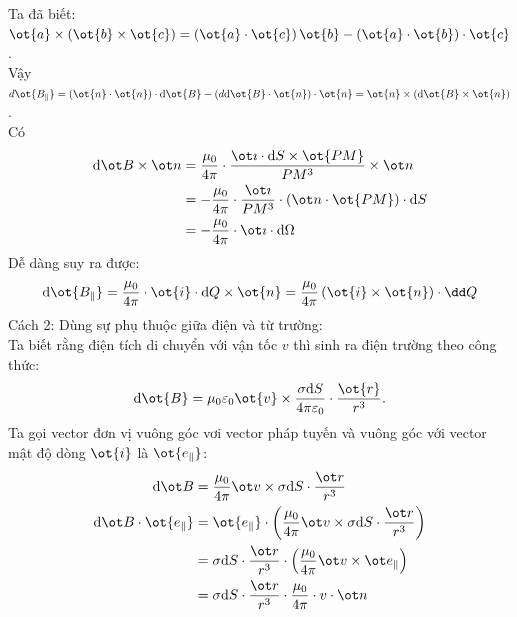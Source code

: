 \begin{loigiai}
\begin{enumerate}[1)]
Ta đã biết: $\ot{a}\times\left(\ot{b}\times\ot{c}\right)=\left(\ot{a}\cdot\ot{c}\right)\ot{b}-\left(\ot{a}\cdot\ot{b}\right)\cdot\ot{c}$.\\
Vậy $d\ot{B_\parallel}=\left(\ot{n}\cdot\ot{n}\right)\cdot \mathrm{d}\ot{B}-\left(d\mathrm{d}\ot{B}\cdot\ot{n}\right)\cdot\ot{n}=\ot{n}\times\left(\mathrm{d}\ot{B}\times\ot{n}\right)$.\\
Có
\begin{align*}
    \mathrm{d}\ot B \times \ot n &= \dfrac{{{\mu _0}}}{{4\pi }} \cdot \dfrac{{\ot \imath  \cdot \mathrm{d}S \times \ot {PM} }}{{P{M^3}}} \times \ot n \\&=  - \dfrac{{{\mu _0}}}{{4\pi }} \cdot \dfrac{{\ot \imath }}{{P{M^3}}} \cdot (\ot n \cdot \ot {PM} ) \cdot \mathrm{d}S \\&=  - \dfrac{{{\mu _0}}}{{4\pi }} \cdot \ot \imath  \cdot \mathrm{d}\Omega
\end{align*}
Dễ dàng suy ra được:
$$\mathrm{d}\ot{B_\parallel}=\dfrac{\mu_0}{4\pi}\cdot \ot{i}\cdot \mathrm{d}Q\times\ot{n}=\dfrac{\mu_0}{4\pi}\left(\ot{i}\times\ot{n}\right)\cdot \dd Q$$
Cách 2: Dùng sự phụ thuộc giữa điện và từ trường:\\
Ta biết rằng điện tích di chuyển với vận tốc $v$ thì sinh ra điện trường theo công thức:
$$\mathrm{d}\ot{B}=\mu_0\varepsilon_0\ot{v}\times\dfrac{\sigma \mathrm{d}S}{4\pi\varepsilon_0}\cdot\dfrac{\ot{r}}{r^3}.$$
Ta gọi vector đơn vị vuông góc vơi vector pháp tuyến và vuông góc với vector mật độ dòng $\ot{i}$ là $\ot{e_\parallel}$:
\begin{align*}
    \mathrm{d}\ot B &= \dfrac{{{\mu_0}}}{{4\pi }}\ot v \times \sigma \mathrm{d}S \cdot \dfrac{{\ot r}}{{{r^3}}}\\
\mathrm{d}\ot B \cdot \ot {{e_\parallel}}  &= \ot {{e_\parallel}}  \cdot \left( {\dfrac{{{\mu_0}}}{{4\pi }}\ot v \times \sigma \mathrm{d}S \cdot \dfrac{{\ot r}}{{{r^3}}}} \right)
\\&= \sigma \mathrm{d}S \cdot \dfrac{{\ot r}}{{{r^3}}} \cdot \left( {\dfrac{\mu_0}{4\pi }\ot v \times {{\ot e_\parallel}}} \right) \\&= \sigma \mathrm{d}S \cdot \dfrac{{\ot r}}{{{r^3}}} \cdot \dfrac{{{\mu _0}}}{{4\pi }} \cdot v \cdot \ot n
\end{align*}


\end{enumerate}
\end{loigiai}
